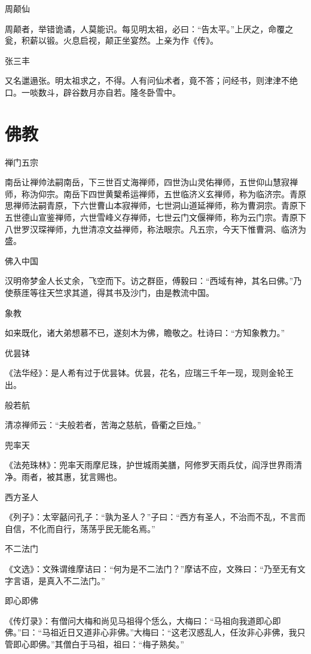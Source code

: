 \documentclass[a4paper,12pt,UTF8,twoside]{ctexbook}
\begin{document}
    周颠仙
    
    周颠者，举错诡谲，人莫能识。每见明太祖，必曰：“告太平。”上厌之，命覆之瓮，积薪以锻。火息启视，颠正坐宴然。上亲为作《传》。
    
    张三丰
    
    又名邋遢张。明太祖求之，不得。人有问仙术者，竟不答；问经书，则津津不绝口。一啖数斗，辟谷数月亦自若。隆冬卧雪中。
    
    \chapter{佛教}
    
    禅门五宗
    
    南岳让禅帅法嗣南岳，下三世百丈海禅师，四世沩山灵佑禅师，五世仰山慧寂禅师，称沩仰宗。南岳下四世黄櫱希运禅师，五世临济义玄禅师，称为临济宗。青原思禅师法嗣青原，下六世曹山本寂禅师，七世洞山道延禅师，称为曹洞宗。青原下五世德山宣鉴禅师，六世雪峰义存禅师，七世云门文偃禅师，称为云门宗。青原下八世罗汉琛禅师，九世清凉文益禅师，称法眼宗。凡五宗，今天下惟曹洞、临济为盛。
    
    佛入中国
    
    汉明帝梦金人长丈余，飞空而下。访之群臣，傅毅曰：“西域有神，其名曰佛。”乃使蔡厓等往天竺求其道，得其书及沙门，由是教流中国。
    
    象教
    
    如来既化，诸大弟想慕不已，遂刻木为佛，瞻敬之。杜诗曰：“方知象教力。”
    
    优昙钵
    
    《法华经》：是人希有过于优昙钵。优昙，花名，应瑞三千年一现，现则金轮王出。
    
    般若航
    
    清凉禅师云：“夫般若者，苦海之慈航，昏衢之巨烛。”
    
    兜率天
    
    《法苑珠林》：兜率天雨摩尼珠，护世城雨美膳，阿修罗天雨兵仗，阎浮世界雨清净。雨者，被其惠，犹言赐也。
    
    西方圣人
    
    《列子》：太宰嚭问孔子：“孰为圣人？”子曰：“西方有圣人，不治而不乱，不言而自信，不化而自行，荡荡乎民无能名焉。”
    
    不二法门
    
    《文选》：文殊谓维摩诘曰：“何为是不二法门？”摩诘不应，文殊曰：“乃至无有文字言语，是真入不二法门。”
    
    即心即佛
    
    《传灯录》：有僧问大梅和尚见马祖得个恁么，大梅曰：“马祖向我道即心即佛。”曰：“马祖近日又道非心非佛。”大梅曰：“这老汉惑乱人，任汝非心非佛，我只管即心即佛。”其僧白于马祖，祖曰：“梅子熟矣。”
    
\end{document}
